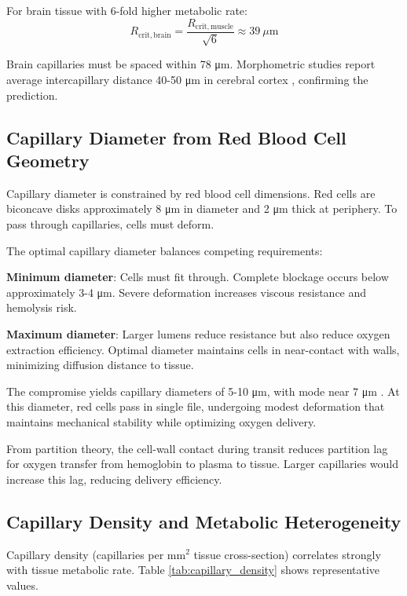 \documentclass[10pt,twocolumn,a4paper]{article}
\theoremstyle{remark}
\begin{document}
For brain tissue with 6-fold higher metabolic rate:
\begin{equation}
R_{\mathrm{crit,brain}} = \frac{R_{\mathrm{crit,muscle}}}{\sqrt{6}} \approx 39~\mu\mathrm{m}
\end{equation}

Brain capillaries must be spaced within 78 μm. Morphometric studies report average intercapillary distance 40-50 μm in cerebral cortex \cite{pawlik1981quantitative}, confirming the prediction.

\subsection{Capillary Diameter from Red Blood Cell Geometry}

Capillary diameter is constrained by red blood cell dimensions. Red cells are biconcave disks approximately 8 μm in diameter and 2 μm thick at periphery. To pass through capillaries, cells must deform.

The optimal capillary diameter balances competing requirements:

\textbf{Minimum diameter}: Cells must fit through. Complete blockage occurs below approximately 3-4 μm. Severe deformation increases viscous resistance and hemolysis risk.

\textbf{Maximum diameter}: Larger lumens reduce resistance but also reduce oxygen extraction efficiency. Optimal diameter maintains cells in near-contact with walls, minimizing diffusion distance to tissue.

The compromise yields capillary diameters of 5-10 μm, with mode near 7 μm \cite{zweifach1973morphometric}. At this diameter, red cells pass in single file, undergoing modest deformation that maintains mechanical stability while optimizing oxygen delivery.

From partition theory, the cell-wall contact during transit reduces partition lag for oxygen transfer from hemoglobin to plasma to tissue. Larger capillaries would increase this lag, reducing delivery efficiency.

\subsection{Capillary Density and Metabolic Heterogeneity}

Capillary density (capillaries per mm$^{2}$ tissue cross-section) correlates strongly with tissue metabolic rate. Table \ref{tab:capillary_density} shows representative values.
\end{document}
